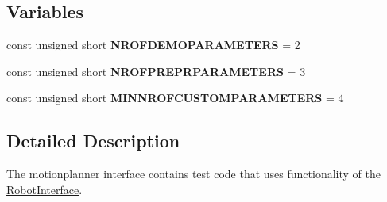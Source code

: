 \subsection*{Variables}
\begin{DoxyCompactItemize}
\item 
const unsigned short {\bfseries N\+R\+O\+F\+D\+E\+M\+O\+P\+A\+R\+A\+M\+E\+T\+E\+RS} = 2\hypertarget{namespaceMotionPlanner_afcb37e6cef602a6acc56cd8f5b085ecb}{}\label{namespaceMotionPlanner_afcb37e6cef602a6acc56cd8f5b085ecb}

\item 
const unsigned short {\bfseries N\+R\+O\+F\+P\+R\+E\+P\+R\+P\+A\+R\+A\+M\+E\+T\+E\+RS} = 3\hypertarget{namespaceMotionPlanner_acf8f40a4fe59f02df7fd5c3fac64e0b3}{}\label{namespaceMotionPlanner_acf8f40a4fe59f02df7fd5c3fac64e0b3}

\item 
const unsigned short {\bfseries M\+I\+N\+N\+R\+O\+F\+C\+U\+S\+T\+O\+M\+P\+A\+R\+A\+M\+E\+T\+E\+RS} = 4\hypertarget{namespaceMotionPlanner_a7803747ba4bcc806bf0373587a24ae9f}{}\label{namespaceMotionPlanner_a7803747ba4bcc806bf0373587a24ae9f}

\end{DoxyCompactItemize}


\subsection{Detailed Description}
The motionplanner interface contains test code that uses functionality of the \hyperlink{classMotionPlanner_1_1RobotInterface}{Robot\+Interface}. 